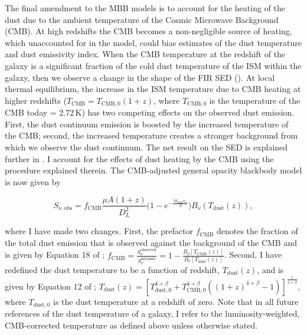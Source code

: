 The final amendment to the MBB models is to account for the heating of the dust due to the ambient temperature of the Cosmic Microwave Background (CMB). At high redshifts the CMB becomes a non-negligible source of heating, which unaccounted for in the model, could bias estimates of the dust temperature and dust emissivity index. When the CMB temperature at the redshift of the galaxy is a significant fraction of the cold dust temperature of the ISM within the galaxy, then we observe a change in the shape of the FIR SED (\citealt{daCunha_2013}). At local thermal equilibrium, the increase in the ISM temperature due to CMB heating at higher redshifts ($T_{\textrm{CMB}} = T_{\textrm{CMB}, 0}(1+z)$, where $T_{\textrm{CMB}, 0}$ is the temperature of the CMB today = 2.72\,K) has two competing effects on the observed dust emission. First, the dust continuum emission is boosted by the increased temperature of the CMB; second, the increased temperature creates a stronger background from which we observe the dust continuum. The net result on the SED is explained further in \citealt{daCunha_2013}. I account for the effects of dust heating by the CMB using the procedure explained therein. The CMB-adjusted general opacity blackbody model is now given by 

\begin{equation}
	S_{\nu, \textrm{obs}} = f_{\textrm{CMB}}\frac{\mu A (1+z)}{D_L^2}\Bigg(1 - e^{- \frac{M_{\textrm{dust}}\kappa_\nu}{A}}\Bigg) B_\nu(T_{\textrm{dust}}(z)),
		\label{eq:modified_blackbody_general_opacity_a_cmb}
\end{equation}

where I have made two changes. First, the prefactor $f_{\textrm{CMB}}$ denotes the fraction of the total dust emission that is observed against the background of the CMB and is given by Equation 18 of \citealt{daCunha_2013}; $f_{\textrm{CMB}} = \frac{S_\nu^{\textrm{observed}}}{S_\nu^{\textrm{intrinsic}}} = 1 - \frac{B_\nu[T_{\textrm{CMB}}(z)]}{B_\nu[T_{\textrm{dust}}(z)]}$. Second, I have redefined the dust temperature to be a function of redshift, $T_{\textrm{dust}}(z)$, and is given by Equation 12 of \citealt{daCunha_2013}; $T_{\textrm{dust}}(z) = [T_{\textrm{dust}, 0}^{4+\beta} + T_{\textrm{CMB}, 0}^{4+\beta} ((1+z)^{4+\beta} - 1)]^{\frac{1}{4+\beta}}$, where $T_{\textrm{dust}, 0}$ is the dust temperature at a redshift of zero. Note that in all future references of the dust temperature of a galaxy, I refer to the luminosity-weighted, CMB-corrected temperature as defined above unless otherwise stated.

